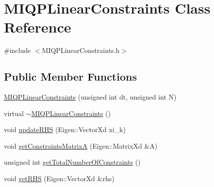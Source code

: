 \hypertarget{classMIQPLinearConstraints}{\section{\-M\-I\-Q\-P\-Linear\-Constraints \-Class \-Reference}
\label{classMIQPLinearConstraints}
}


{\ttfamily \#include $<$\-M\-I\-Q\-P\-Linear\-Constraints.\-h$>$}

\subsection*{\-Public \-Member \-Functions}
\begin{DoxyCompactItemize}
\item 
\hyperlink{classMIQPLinearConstraints_a09f79be23a0269104add07a52c52f90f}{\-M\-I\-Q\-P\-Linear\-Constraints} (unsigned int dt, unsigned int \-N)
\item 
virtual \hyperlink{classMIQPLinearConstraints_a1539d3c8eb2af42daa9bb17dd0f44bd2}{$\sim$\-M\-I\-Q\-P\-Linear\-Constraints} ()
\item 
void \hyperlink{classMIQPLinearConstraints_aad3232078ef93e2105a1c619c510f16a}{update\-R\-H\-S} (\-Eigen\-::\-Vector\-Xd xi\-\_\-k)
\item 
void \hyperlink{classMIQPLinearConstraints_ab556e990dcc0b1fcd152f41a8c00e1f6}{get\-Constraints\-Matrix\-A} (\-Eigen\-::\-Matrix\-Xd \&\-A)
\item 
unsigned int \hyperlink{classMIQPLinearConstraints_a656681ab464709b025e4522df3458fa1}{get\-Total\-Number\-Of\-Constraints} ()
\item 
void \hyperlink{classMIQPLinearConstraints_abf2bd3e8f0dfa5b919efa1b90b56232a}{get\-R\-H\-S} (\-Eigen\-::\-Vector\-Xd \&rhs)
\end{DoxyCompactItemize}
